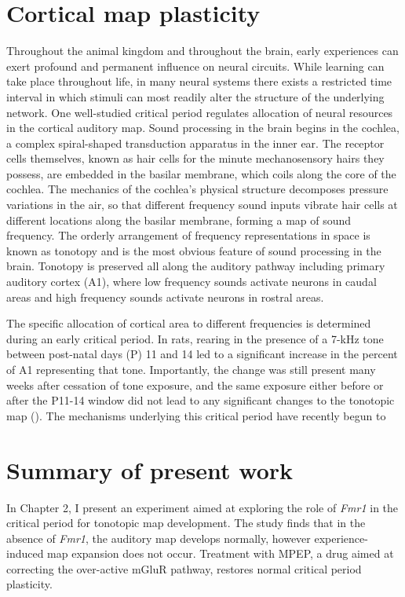 \section{Cortical map plasticity}

Throughout the animal kingdom and throughout the brain, early experiences can exert profound and permanent influence on neural circuits. While learning can take place throughout life, in many neural systems there exists a restricted time interval in which stimuli can most readily alter the structure of the underlying network. One well-studied critical period regulates allocation of neural resources in the cortical auditory map. Sound processing in the brain begins in the cochlea, a complex spiral-shaped transduction apparatus in the inner ear. The receptor cells themselves, known as hair cells for the minute mechanosensory hairs they possess, are embedded in the basilar membrane, which coils along the core of the cochlea. The mechanics of the cochlea's physical structure decomposes pressure variations in the air, so that different frequency sound inputs vibrate hair cells at different locations along the basilar membrane, forming a map of sound frequency. The orderly arrangement of frequency representations in space is known as tonotopy and is the most obvious feature of sound processing in the brain. Tonotopy is preserved all along the auditory pathway including primary auditory cortex (A1), where low frequency sounds activate neurons in caudal areas and high frequency sounds activate neurons in rostral areas.

The specific allocation of cortical area to different frequencies is determined during an early critical period. In rats, rearing in the presence of a 7-kHz tone between post-natal days (P) 11 and 14 led to a significant increase in the percent of A1 representing that tone. Importantly, the change was still present many weeks after cessation of tone exposure, and the same exposure either before or after the P11-14 window did not lead to any significant changes to the tonotopic map (\cite{DeVillers-Sidani2007}). The mechanisms underlying this critical period have recently begun to 

\section{Summary of present work}

In Chapter 2, I present an experiment aimed at exploring the role of \textit{Fmr1} in the critical period for tonotopic map development. The study finds that in the absence of \textit{Fmr1}, the auditory map develops normally, however experience-induced map expansion does not occur. Treatment with MPEP, a drug aimed at correcting the over-active mGluR pathway, restores normal critical period plasticity.

